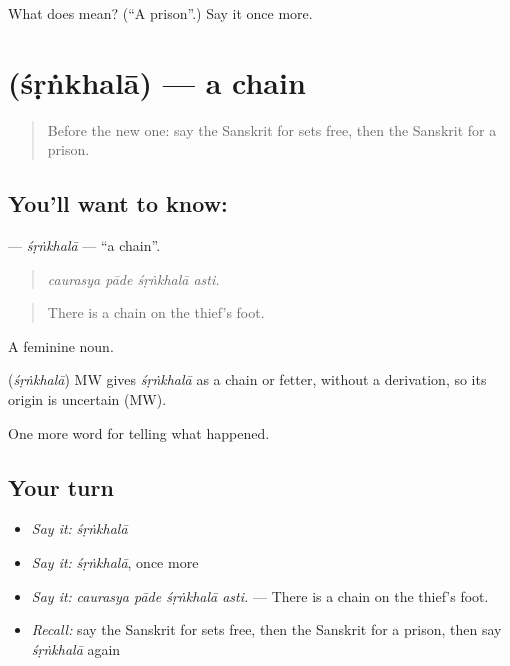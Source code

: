\begin{tcolorbox}[breakable,colback=teal!4,colframe=teal!35!black,title={Before you move on}]
What does  mean? (\textquotedblleft{}A prison\textquotedblright{}.) Say it once more.
\end{tcolorbox}
\section[\texorpdfstring{\sk{शृंखला} (śṛṅkhalā)}{शृंखला (śṛṅkhalā)}]{ (śṛṅkhalā) — a chain}

\label{lesson:SA-C293-srnkhala}



\begin{quote}
Before the new one: say the Sanskrit for sets free, then the Sanskrit for a prison.
\end{quote}

\subsection*{You'll want to know: }
\textbf{} — \emph{śṛṅkhalā} — \textquotedblleft{}a chain\textquotedblright{}.

\begin{quote}
   
\end{quote}

\begin{quote}
\emph{caurasya pāde śṛṅkhalā asti.}
\end{quote}

\begin{quote}
There is a chain on the thief's foot.
\end{quote}

A feminine noun.

\begin{cousinweb}
\textbf{} (\emph{śṛṅkhalā}) MW gives \emph{śṛṅkhalā} as a chain or fetter, without a derivation, so its origin is uncertain (MW).
\end{cousinweb}

\begin{grammarlens}[title={What you've built}]
One more word for telling what happened.
\end{grammarlens}

\subsection*{Your turn}
\begin{itemize}
\raggedright
  \item \emph{Say it:} \emph{śṛṅkhalā}
  \item \emph{Say it:} \emph{śṛṅkhalā}, once more
  \item \emph{Say it:} \emph{caurasya pāde śṛṅkhalā asti.} — There is a chain on the thief's foot.
  \item \emph{Recall:} say the Sanskrit for sets free, then the Sanskrit for a prison, then say \emph{śṛṅkhalā} again
\end{itemize}

